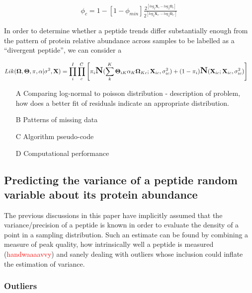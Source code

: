 \documentclass[12pt]{article}
\begin{document}
\begin{align}
\phi_{c} = 1 - [1 - \phi_{min}]\frac{2^{[log_{2}\textbf{X}_{c} - log_{2}\boldsymbol\Omega_{c}]}}{2^{[log_{2}\textbf{X}_{c'} - log_{2}\boldsymbol\Omega_{c'}]}}\label{covamount}
\end{align}

In order to determine whether a peptide trends differ substantially enough from the pattern of protein relative abundance across samples to be labelled as a ``divergent peptide'', we can consider a

\begin{align}
Lik(\mathbf{\Omega}, \mathbf{\Theta}, \pi, \alpha | \sigma^{2}, \textbf{X}) &= \prod_{i}^{I}\prod_{c}^{C}\left[ \pi_{i}\mbox{\Large \textbf{N}}(\sum_{k}^{K}\mathbf{\Theta}_{iK}\alpha_{K}\mathbf{\Omega}_{Kc} ; \textbf{X}_{ic}, \sigma^{2}_{ic}) + (1-\pi_{i})\mbox{\Large \textbf{N}}( \textbf{X}_{ic}; \textbf{X}_{ic}, \sigma^{2}_{ic}) \right]
\end{align}

\color{red}
\begin{itemize}
\item[A] Comparing log-normal to poisson distribution - description of problem, how does a better fit of residuals indicate an appropriate distribution.
\item[B] Patterns of missing data
\item[C] Algorithm pseudo-code
\item[D] Computational performance
\end{itemize}
\color{black}

\subsection*{Predicting the variance of a peptide random variable about its protein abundance}

The previous discussions in this paper have implicitly assumed that the variance/precision of a peptide is known in order to evaluate the density of a point in a sampling distribution.  Such an estimate can be found by combining a measure of peak quality, how intrinsically well a peptide is measured (\textcolor{red}{handwaaaavvy}) and sanely dealing with outliers whose inclusion could inflate the estimation of variance.

\subsubsection*{Outliers}
\end{document}
